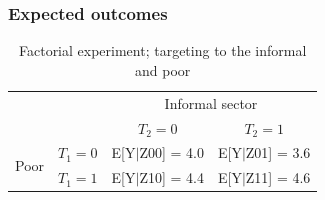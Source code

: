 \documentclass{beamer}\usepackage[]{graphicx}\usepackage[]{color}
\begin{document}
\begin{frame}\frametitle{Expected outcomes}
    
\begin{table}[tb]
	\caption{Factorial experiment; targeting to the informal and poor}
	\label{tab:tablename}
	\centering

	\begin{tabular}{ll|cc}
	\hline

	\hline

	&\textbf{} & \multicolumn{2}{c}{Informal sector} \\
	&\textbf{} & \textbf{$T_2=0$} & \textbf{ $T_2=1$} \\
	\hline
\multirow{2}{*}{Poor}	&\textbf{$T_1=0$} & E[Y$|$Z00] = 4.0   & E[Y$|$Z01] = 3.6 \\
	                    &\textbf{$T_1=1$} & E[Y$|$Z10] = 4.4   & E[Y$|$Z11] = 4.6 \\
	\hline

	\hline
	\end{tabular}
\end{table}

\end{frame}
\end{document}
